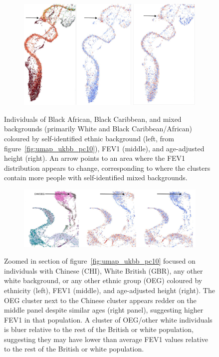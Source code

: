\documentclass[12pt]{pnas-new}
\begin{document}
\begin{figure}
    \centering
    \begin{subfigure}{\textwidth}
    \includegraphics[width=\textwidth]{images/montage_fev1_height_afr_permuted.pdf}
    \end{subfigure}
    \caption{Individuals of Black African, Black Caribbean, and mixed backgrounds (primarily White and Black Caribbean/African) coloured by self-identified ethnic background (left, from figure~\ref{fig:umap_ukbb_pc10}), FEV1 (middle), and age-adjusted height (right). An arrow points to an area where the FEV1 distribution appears to change, corresponding to where the clusters contain more people with self-identified mixed backgrounds.}
    \label{fig:supp_comparison_fev_afr}
\end{figure}

\begin{figure}
    \centering
    \begin{subfigure}{\textwidth}
    \includegraphics[width=\textwidth]{images/montage_fev1_height_chi_eur_permuted.pdf}
    \end{subfigure}
    \caption{Zoomed in section of figure~\ref{fig:umap_ukbb_pc10} focused on individuals with Chinese (CHI), White British (GBR), any other white background, or any other ethnic group (OEG) coloured by ethnicity (left), FEV1 (middle), and age-adjusted height (right). The OEG cluster next to the Chinese cluster appears redder on the middle panel despite similar ages (right panel), suggesting higher FEV1 in that population. A cluster of OEG/other white individuals is bluer relative to the rest of the British or white population, suggesting they may have lower than average FEV1 values relative to the rest of the British or white population.}
    \label{fig:supp_comparison_fev_chi_eur}
\end{figure}
\end{document}
